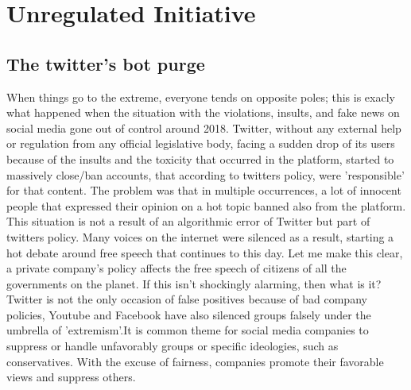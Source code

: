 \documentclass[openany]{article}
\begin{document}
	\section{Unregulated Initiative}
	\subsection*{The twitter's bot purge}
		When things go to the extreme, everyone tends on opposite poles; this is exacly what happened when the situation with the violations, 
		insults, and fake news on social media gone out of control around 2018\cite{twitter-crisis}. Twitter, without any external help or 
		regulation from any official legislative body, facing a sudden drop of its users because of the insults and the toxicity that occurred in the 
		platform, started to massively close/ban accounts, that according to twitters policy, were 'responsible' for that content. 
		The problem was that in multiple occurrences, a lot of innocent people that expressed their opinion on a hot topic banned\cite{bot-purge} 
		also from the platform. This situation is not a result of an algorithmic error of Twitter but part of twitters policy. Many voices on 
		the internet were silenced as a result, starting a hot debate around free speech that continues to this day. Let me make this clear, 
		a private company's policy affects the free speech of citizens of all the governments on the planet. If this isn't shockingly alarming, 
		then what is it? Twitter is not the only occasion of false positives  because of bad company policies, Youtube\cite{prageru-youtube} 
		and Facebook\cite{facebook-censor} have also silenced groups falsely under the umbrella of 'extremism'.It is common theme for social 
		media companies to suppress or handle unfavorably groups or specific ideologies, such as conservatives\cite{prageru-youtube}. 
		With the excuse of fairness, companies promote their favorable views and suppress others.
	
\end{document}
